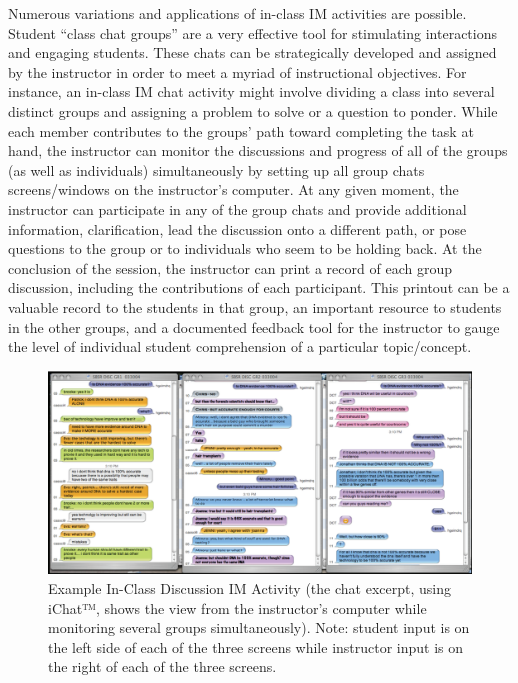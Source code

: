 \documentclass[11.5pt]{sig-alternate} %
\begin{document}
\begin{large}
Numerous variations and applications of in-class IM activities are possible. Student “class chat groups” are a very effective tool for stimulating interactions and engaging students. These chats can be strategically developed and assigned by the instructor in order to meet a myriad of instructional objectives. For instance, an in-class IM chat activity might involve dividing a class into several distinct groups and assigning a problem to solve or a question to ponder. While each member contributes to the groups’ path toward completing the task at hand, the instructor can monitor the discussions and progress of all of the groups (as well as individuals) simultaneously by setting up all group chats screens/windows on the instructor’s computer. At any given moment, the instructor can participate in any of the group chats and provide additional information, clarification, lead the discussion onto a different path, or pose questions to the group or to individuals who seem to be holding back. At the conclusion of the session, the instructor can print a record of each group discussion, including the contributions of each participant. This printout can be a valuable record to the students in that group, an important resource to students in the other groups, and a documented feedback tool for the instructor to gauge the level of individual student comprehension of a particular topic/concept. 

\begin{figure}[t]
    \centering
    \includegraphics[width=1\textwidth]{images/fig1.png}
    \caption{Example In-Class Discussion IM Activity (the chat excerpt, using iChat™, shows the view from the instructor’s computer while monitoring several groups simultaneously). Note: student input is on the left side of each of the three screens while instructor input is on the right of each of the three screens. }
\end{figure}


\end{large}
\end{document}
